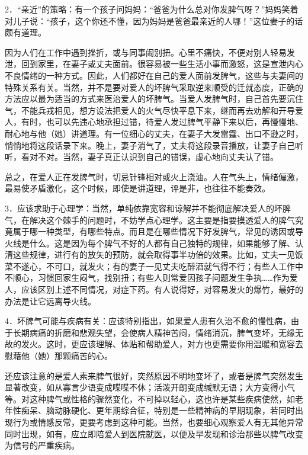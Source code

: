 \documentclass[12pt,UTF8,openany]{ctexbook}
\begin{document}
2．“亲近”的策略：有一个孩子问妈妈：“爸爸为什么总对你发脾气呀？”妈妈笑着对儿子说：“孩子，这个你还不懂，因为妈妈是爸爸最亲近的人哪！”这位妻子的话颇有道理。

因为人们在工作中遇到挫折，或与同事闹别扭。心里不痛快，不便对别人轻易发泄，回到家里，在妻子或丈夫面前。很容易被一些生活小事而激怒，这是宣泄内心不良情绪的一种方式。因此，人们都好在自己的爱人面前发脾气，这些与夫妻间的特殊关系有关。当然，并不是要对爱人的坏脾气采取逆来顺受的迁就态度，正确的方法应以最为适当的方式来医治爱人的坏脾气。当爱人发脾气时，自己首先要沉住气，不能兵戎相见，想方设法把爱人的火气尽快平息下来，继而再去劝解和开导爱人，有时，也可以先违心地承担过错，待爱人发过脾气平静下来以后，再慢慢地、耐心地与他（她）讲道理。有一位细心的丈夫，在妻子大发雷霆、出口不逊之时，悄悄地将这段话录下来。晚上，妻子消气了，丈夫将这段录音播放，让妻子自己听听，看对不对。当然，妻子真正认识到自己的错误，虚心地向丈夫认了错。

总之，在爱人正在发脾气时，切忌针锋相对或火上浇油。人在气头上，情绪偏激，最易使矛盾激化，这个时候，即使是讲道理，评是非，也往往不能奏效。

3．应该求助于心理学：当然，单纯依靠宽容和谅解并不能彻底解决爱人的坏脾气，在解决这个棘手的问题时，不妨学点心理学。这主要是指要摸透爱人的脾气究竟属于哪一种类型，有哪些特点。而且是在哪些情况下好发脾气，常见的诱因或导火线是什么。这是因为每个脾气不好的人都有自己独特的规律，如果能够了解、认清这些规律，进行有的放矢的预防，就会取得事半功倍的效果。比如，丈夫一见饭菜不遂心，不可口，就发火；有的妻子一见丈夫吃醉酒就气得不行；有些人工作中不顺心，习惯回家生闷气，找别扭；有些人则常爱因孩子问题发生争执……作为爱人，应该区别上述不同情况，对症下药。有人说得好，对容易发火的爆竹，最好的办法是让它远离导火线。

4．坏脾气可能与疾病有关：应该特别指出，如果爱人患有久治不愈的慢性病，由于长期病痛的折磨和悲观失望，会使病人精神苦闷，情绪消沉，脾气变坏，无缘无故的发火。这时，更应该理解、体贴和帮助爱人，对方也更需要你用温暖和宽容去慰藉他（她）那颗痛苦的心。

还应该注意的是爱人素来脾气很好，突然原因不明地变坏了，或者是脾气突然发生显著改变，如从寡言少语变成喋喋不休；活泼开朗变成缄默无语；大方变得小气等。对这种脾气或性格的骤然变化，不可掉以轻心，这也许是某些疾病使然，如老年性痴呆、脑动脉硬化、更年期综合征，特别是一些精神病的早期现象，若同时出现行为或情感反常，更要考虑到这种可能。当然，也要细心观察爱人有无其他异常同时出现，如有，应立即陪爱人到医院就医，以便及早发现和诊治那些以脾气改变为信号的严重疾病。
\end{document}

